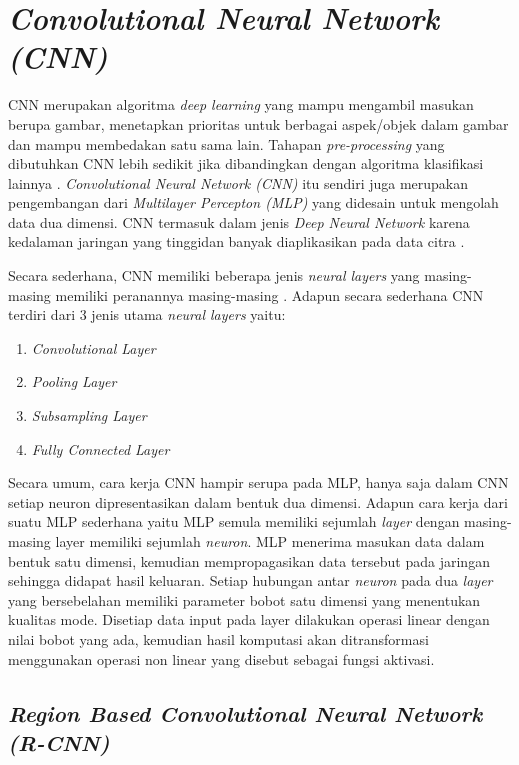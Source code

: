 \section{\textit{Convolutional Neural Network (CNN)}}
\label{sec:convolutionalneuralnetwork}
CNN merupakan algoritma \textit{deep learning} yang mampu mengambil masukan berupa gambar, menetapkan prioritas untuk berbagai aspek/objek dalam gambar dan mampu membedakan satu sama lain. Tahapan \textit{pre-processing} yang dibutuhkan CNN lebih sedikit jika dibandingkan dengan algoritma klasifikasi lainnya \citep*{towardsDS}. \textit{Convolutional Neural Network (CNN)} itu sendiri juga merupakan pengembangan dari \textit{Multilayer Percepton (MLP)} yang didesain untuk mengolah data dua dimensi. CNN termasuk dalam jenis \textit{Deep Neural Network} karena kedalaman jaringan yang tinggidan banyak diaplikasikan pada data citra \citep*{putra2016klasifikasi}.\par
Secara sederhana, CNN memiliki beberapa jenis \textit{neural layers} yang masing-masing memiliki peranannya masing-masing \citep*{voulodimos2018deep}. Adapun secara sederhana CNN terdiri dari 3 jenis utama \textit{neural layers} yaitu: \par
\begin{enumerate}[nolistsep]
    \item \textit{Convolutional Layer}
    \item \textit{Pooling Layer}
    \item \textit{Subsampling Layer}
    \item \textit{Fully Connected Layer}
\end{enumerate}
\par
Secara umum, cara kerja CNN hampir serupa pada MLP, hanya saja dalam CNN setiap neuron dipresentasikan dalam bentuk dua dimensi. Adapun cara kerja dari suatu MLP sederhana yaitu MLP semula memiliki sejumlah \textit{layer} dengan masing-masing layer memiliki sejumlah \textit{neuron}. MLP menerima masukan data dalam bentuk satu dimensi, kemudian mempropagasikan data tersebut pada jaringan sehingga didapat hasil keluaran. Setiap hubungan antar \textit{neuron} pada dua \textit{layer} yang bersebelahan memiliki parameter bobot satu dimensi yang menentukan kualitas mode. Disetiap data input pada layer dilakukan operasi linear dengan nilai bobot yang ada, kemudian hasil komputasi akan ditransformasi menggunakan operasi non linear yang disebut sebagai fungsi aktivasi. \par

\subsection{\textit{Region Based Convolutional Neural Network (R-CNN)}}
\label{subsec:regionbasedconvolutionalneuralnetwork}

